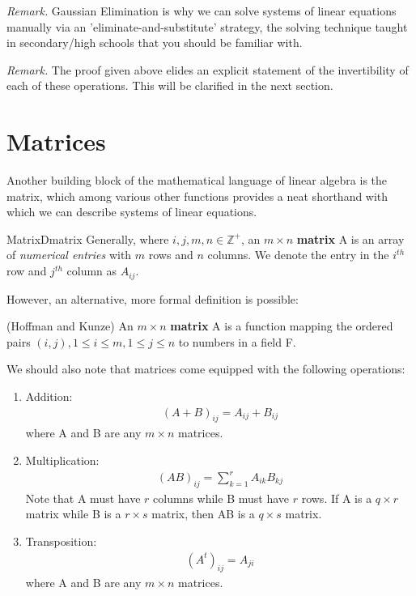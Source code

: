 \documentclass[oneside]{book}
\begin{document}
	\textit{Remark.} Gaussian Elimination is why we can solve systems of linear equations manually via an 'eliminate-and-substitute' strategy, the solving technique taught in secondary/high schools that you should be familiar with.
	
	\textit{Remark.} The proof given above elides an explicit statement of the invertibility of each of these operations. This will be clarified in the next section.
	
	\newpage
	
	\section{Matrices}
	
	Another building block of the mathematical language of linear algebra is the matrix, which among various other functions provides a neat shorthand with which we can describe systems of linear equations.
	
	\begin{defn}{Matrix}{Dmatrix}
		Generally, where $i,j,m,n \in \mathbb{Z^+}$, an $m \times n$ \textbf{matrix} A is an array of \textit{numerical entries} with $m$ rows and $n$ columns. We denote the entry in the $i^{th}$ row and $j^{th}$ column as $A_{ij}$. 
		
		However, an alternative, more formal definition is possible:
		
		(Hoffman and Kunze) An $m \times n$ \textbf{matrix} A is a function mapping the ordered pairs $(i,j), 1 \leq i \leq m, 1 \leq j \leq n$ to numbers in a field F.
	\end{defn}
	We should also note that matrices come equipped with the following operations:
	\begin{enumerate}
		\item Addition: 
			\begin{align*}
				(A+B)_{ij}=A_{ij}+B_{ij}
			\end{align*}
		where A and B are any $m \times n$ matrices.
		\item Multiplication: 
			\begin{align*}
				(AB)_{ij}=\sum_{k=1}^{r}{A_{ik}B_{kj}} 
			\end{align*}
		Note that A must have $r$ columns while B must have $r$ rows. If A is a $q \times r$ matrix while B is a $r \times s$ matrix, then AB is a $q \times s$ matrix.
		\item Transposition:
		\begin{align*}
			(A^t)_{ij}=A_{ji}
		\end{align*} 
		where A and B are any $m \times n$ matrices.
	\end{enumerate}
\end{document}
